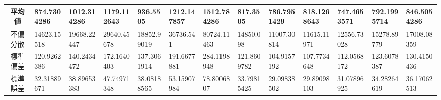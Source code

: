 \begin{tabularx}{\textwidth}{|c|L|L|L|L|L|L|L|L|L|L|L|L|}
    平均値                    & 874.7304286                  & 1012.314286                   & 1179.112643                   & 936.5505                      & 1212.147857 & 1512.784286 & 817.3505    & 786.7951429 & 818.1268643 & 747.4653571 & 792.1995714 & 846.5054286 \\ \hline
    不偏分散                   & 14623.15518                  & 19668.22447                   & 29640.45678                   & 18852.99019                   & 36736.541   & 80724.11463 & 14850.098   & 11007.30814 & 11615.11971 & 12556.73028 & 15278.89779 & 17008.08359 \\ \hline
    標準偏差                   & 120.9262386                  & 140.2434472                   & 172.1640403                   & 137.3061914                   & 191.6677881 & 284.1198948 & 121.8609782 & 104.9157192 & 107.7734648 & 112.0568172 & 123.6078387 & 130.4150436 \\ \hline
    標準誤差                   & 32.31889671                  & 38.89653383                   & 47.74971348                   & 38.08188565                   & 53.15907984 & 78.8006807  & 33.79815425 & 29.09838502 & 29.89098103 & 31.07896925 & 34.28264619 & 36.17062513 \\ \hline
\end{tabularx}
